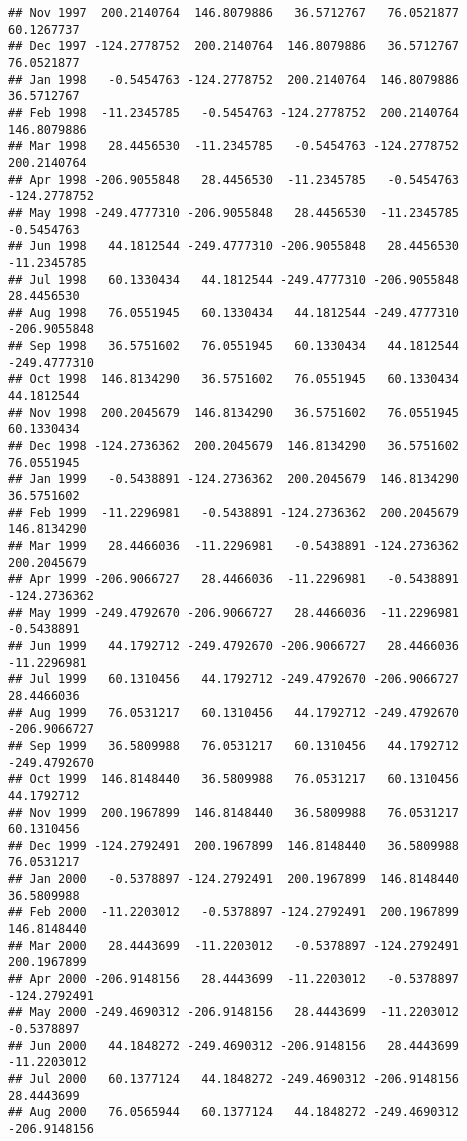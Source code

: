 \documentclass[]{article}
\begin{document}
\begin{verbatim}
## Nov 1997  200.2140764  146.8079886   36.5712767   76.0521877   60.1267737
## Dec 1997 -124.2778752  200.2140764  146.8079886   36.5712767   76.0521877
## Jan 1998   -0.5454763 -124.2778752  200.2140764  146.8079886   36.5712767
## Feb 1998  -11.2345785   -0.5454763 -124.2778752  200.2140764  146.8079886
## Mar 1998   28.4456530  -11.2345785   -0.5454763 -124.2778752  200.2140764
## Apr 1998 -206.9055848   28.4456530  -11.2345785   -0.5454763 -124.2778752
## May 1998 -249.4777310 -206.9055848   28.4456530  -11.2345785   -0.5454763
## Jun 1998   44.1812544 -249.4777310 -206.9055848   28.4456530  -11.2345785
## Jul 1998   60.1330434   44.1812544 -249.4777310 -206.9055848   28.4456530
## Aug 1998   76.0551945   60.1330434   44.1812544 -249.4777310 -206.9055848
## Sep 1998   36.5751602   76.0551945   60.1330434   44.1812544 -249.4777310
## Oct 1998  146.8134290   36.5751602   76.0551945   60.1330434   44.1812544
## Nov 1998  200.2045679  146.8134290   36.5751602   76.0551945   60.1330434
## Dec 1998 -124.2736362  200.2045679  146.8134290   36.5751602   76.0551945
## Jan 1999   -0.5438891 -124.2736362  200.2045679  146.8134290   36.5751602
## Feb 1999  -11.2296981   -0.5438891 -124.2736362  200.2045679  146.8134290
## Mar 1999   28.4466036  -11.2296981   -0.5438891 -124.2736362  200.2045679
## Apr 1999 -206.9066727   28.4466036  -11.2296981   -0.5438891 -124.2736362
## May 1999 -249.4792670 -206.9066727   28.4466036  -11.2296981   -0.5438891
## Jun 1999   44.1792712 -249.4792670 -206.9066727   28.4466036  -11.2296981
## Jul 1999   60.1310456   44.1792712 -249.4792670 -206.9066727   28.4466036
## Aug 1999   76.0531217   60.1310456   44.1792712 -249.4792670 -206.9066727
## Sep 1999   36.5809988   76.0531217   60.1310456   44.1792712 -249.4792670
## Oct 1999  146.8148440   36.5809988   76.0531217   60.1310456   44.1792712
## Nov 1999  200.1967899  146.8148440   36.5809988   76.0531217   60.1310456
## Dec 1999 -124.2792491  200.1967899  146.8148440   36.5809988   76.0531217
## Jan 2000   -0.5378897 -124.2792491  200.1967899  146.8148440   36.5809988
## Feb 2000  -11.2203012   -0.5378897 -124.2792491  200.1967899  146.8148440
## Mar 2000   28.4443699  -11.2203012   -0.5378897 -124.2792491  200.1967899
## Apr 2000 -206.9148156   28.4443699  -11.2203012   -0.5378897 -124.2792491
## May 2000 -249.4690312 -206.9148156   28.4443699  -11.2203012   -0.5378897
## Jun 2000   44.1848272 -249.4690312 -206.9148156   28.4443699  -11.2203012
## Jul 2000   60.1377124   44.1848272 -249.4690312 -206.9148156   28.4443699
## Aug 2000   76.0565944   60.1377124   44.1848272 -249.4690312 -206.9148156

\end{verbatim}
\end{document}
